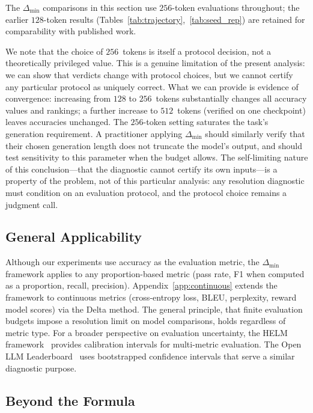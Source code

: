 \documentclass[pdflatex,sn-mathphys-ay,oneside]{sn-jnl}
\theoremstyle{thmstylethree}
\begin{document}
The $\Delta_{\min}$ comparisons in this section use $256$-token evaluations throughout; the earlier $128$-token results (Tables~\ref{tab:trajectory},~\ref{tab:seed_rep}) are retained for comparability with published work.

We note that the choice of $256$~tokens is itself a protocol decision, not a theoretically privileged value. This is a genuine limitation of the present analysis: we can show that verdicts change with protocol choices, but we cannot certify any particular protocol as uniquely correct. What we can provide is evidence of convergence: increasing from $128$ to $256$~tokens substantially changes all accuracy values and rankings; a further increase to $512$~tokens (verified on one checkpoint) leaves accuracies unchanged. The $256$-token setting saturates the task's generation requirement. A practitioner applying $\Delta_{\min}$ should similarly verify that their chosen generation length does not truncate the model's output, and should test sensitivity to this parameter when the budget allows. The self-limiting nature of this conclusion---that the diagnostic cannot certify its own inputs---is a property of the problem, not of this particular analysis: any resolution diagnostic must condition on an evaluation protocol, and the protocol choice remains a judgment call.

\subsection{General Applicability}

Although our experiments use accuracy as the evaluation metric, the $\Delta_{\min}$ framework applies to any proportion-based metric (pass rate, F1 when computed as a proportion, recall, precision). Appendix~\ref{app:continuous} extends the framework to continuous metrics (cross-entropy loss, BLEU, perplexity, reward model scores) via the Delta method. The general principle, that finite evaluation budgets impose a resolution limit on model comparisons, holds regardless of metric type. For a broader perspective on evaluation uncertainty, the HELM framework~\citep{liang2022helm} provides calibration intervals for multi-metric evaluation. The Open LLM Leaderboard~\citep{beeching2023openllm} uses bootstrapped confidence intervals that serve a similar diagnostic purpose.

\subsection{Beyond the Formula}
\end{document}
